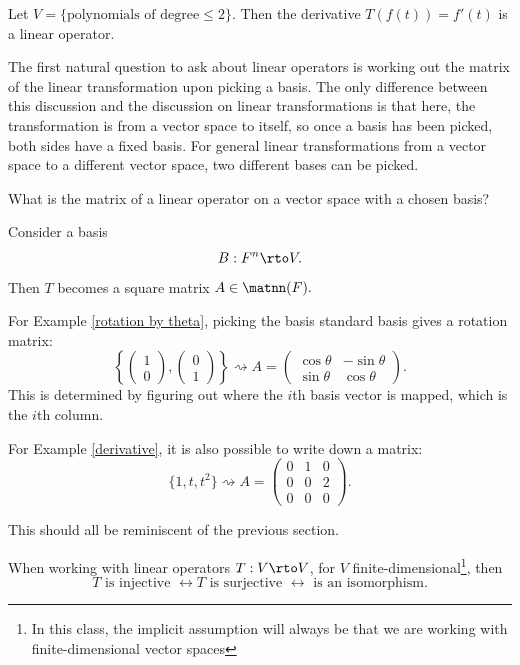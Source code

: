 \begin{example}\label{derivative}
Let $V = \{\text{polynomials of degree} \leq 2\}.$ Then the derivative $T(f(t)) = f'(t)$ is a linear operator.
\end{example}

The first natural question to ask about linear operators is working out the matrix of the linear transformation upon picking a basis. The only difference between this discussion and the discussion on linear transformations is that here, the transformation is from a vector space to itself, so once a basis has been picked, both sides have a fixed basis. For general linear transformations from a vector space to a different vector space, two different bases can be picked. 

\begin{qq}
What is the matrix of a linear operator on a vector space with a chosen basis?
\end{qq}

Consider a basis \[B: F^n \rto V.\] Then $T$ becomes a square matrix $A \in \matnn(F).$ 

For Example \ref{rotation by theta}, picking the basis standard basis gives a rotation matrix: \[\left\{\begin{pmatrix}1 \\ 0\end{pmatrix}, \begin{pmatrix}0 \\ 1\end{pmatrix}\right\} \rightsquigarrow A = \begin{pmatrix} \cos\theta & -\sin\theta \\ \sin\theta & \cos\theta\end{pmatrix}.\] This is determined by figuring out where the $i$th basis vector is mapped, which is the $i$th column.

For Example \ref{derivative}, it is also possible to write down a matrix: \[\{1, t, t^2\} \rightsquigarrow A = \begin{pmatrix}
0 & 1 & 0 \\
0 & 0 & 2 \\
0 & 0 & 0
\end{pmatrix}.\]

This should all be reminiscent of the previous section. 

\begin{proposition}
When working with linear operators $T: V \rto V$, for $V$ finite-dimensional\footnote{In this class, the implicit assumption will always be that we are working with finite-dimensional vector spaces}, then \[T \text{ is injective }\leftrightarrow T \text{ is surjective }\leftrightarrow \text{ is an isomorphism.}\]
\end{proposition}

